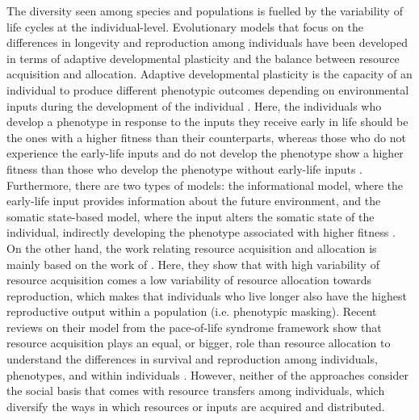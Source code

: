 \documentclass{article}
\begin{document}
The diversity seen among species and populations is fuelled by the variability of life cycles at the individual-level. Evolutionary models that focus on the differences in longevity and reproduction among individuals have been developed in terms of adaptive developmental plasticity and the balance between resource acquisition and allocation. Adaptive developmental plasticity is the capacity of an individual to produce different phenotypic outcomes depending on environmental inputs during the development of the individual \citep{stearns1989evolutionary}. Here, the individuals who develop a phenotype in response to the inputs they receive early in life should be the ones with a higher fitness than their counterparts, whereas those who do not experience the early-life inputs and do not develop the phenotype show a higher fitness than those who develop the phenotype without early-life inputs \citep{bateson2004developmental}. Furthermore, there are two types of models: the informational model, where the early-life input provides information about the future environment, and the somatic state-based model, where the input alters the somatic state of the individual, indirectly developing the phenotype associated with higher fitness \citep{nettle2015adaptive}. On the other hand, the work relating resource acquisition and allocation is mainly based on the work of \cite{van1986acquisition}. Here, they show that with high variability of resource acquisition comes a low variability of resource allocation towards reproduction, which makes that individuals who live longer also have the highest reproductive output within a population (i.e. phenotypic masking). Recent reviews on their model from the pace-of-life syndrome framework show that resource acquisition plays an equal, or bigger, role than resource allocation to understand the differences in survival and reproduction among individuals, phenotypes, and within individuals \citep{laskowski2021integrating,haave2022differences}. However, neither of the approaches consider the social basis that comes with resource transfers among individuals, which diversify the ways in which resources or inputs are acquired and distributed.    
\end{document}
